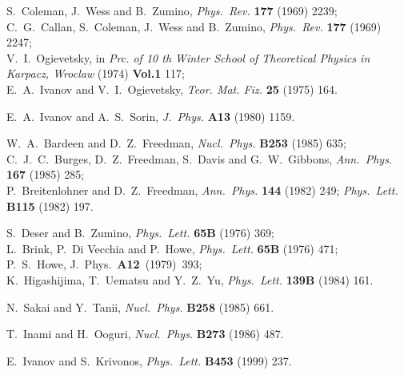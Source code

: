\documentclass[a4paper,12pt]{article}
\begin{document}
\begin{thebibliography}{99}
     S.~Coleman, J.~Wess and B.~Zumino, {\sl Phys.~Rev.} {\bf 177}
     (1969) 2239;\\
     C.~G.~Callan, S.~Coleman, J.~Wess and B.~Zumino, {\sl
     Phys.~Rev.} {\bf 177} (1969) 2247;\\
     V.~I.~Ogievetsky, in {\sl Prc. of 10 th Winter School of
     Theoretical Physics in Karpacz, Wroclaw} (1974) {\bf Vol.1} 117;\\
     E.~A.~Ivanov and  V.~I.~Ogievetsky, {\sl Teor. Mat. Fiz.} {\bf
     25} (1975) 164.

     E.~A.~Ivanov and A.~S.~Sorin, {\sl J.~Phys.} {\bf A13} (1980) 1159.

     W.~A.~Bardeen and D.~Z.~Freedman, {\sl Nucl.~Phys.} {\bf B253} (1985) 
     635;\\
     C.~J.~C.~Burges, D.~Z.~Freedman, S.~Davis and G.~W.~Gibbons,
     {\sl Ann.~Phys.} {\bf 167} (1985) 285;\\
     P.~Breitenlohner and D.~Z.~Freedman, {\sl Ann.~Phys.} {\bf 144} (1982) 
     249; {\sl Phys.~Lett.} {\bf B115} (1982) 197.

     S.~Deser and B.~Zumino, {\sl Phys.~Lett.} {\bf 65B} (1976) 369;\\
     L.~Brink, P.~Di Vecchia and P.~Howe, {\sl Phys.~Lett.} {\bf 65B} 
     (1976) 471;\\
     P.~S.~Howe, J.~Phys.~{\bf A12}~(1979)~393;\\
     K.~Higashijima, T.~Uematsu and Y.~Z.~Yu, {\sl Phys.~Lett.} 
     {\bf 139B} (1984) 161.

     N.~Sakai and Y.~Tanii, {\sl Nucl.~Phys.} {\bf B258} (1985) 661.

     T.~Inami and H.~Ooguri, {\sl Nucl.~Phys.} {\bf B273} (1986) 487.

     E.~Ivanov and S.~Krivonos, {\sl Phys.~Lett.} {\bf B453} (1999)
     237.

\end{thebibliography}
\end{document}
